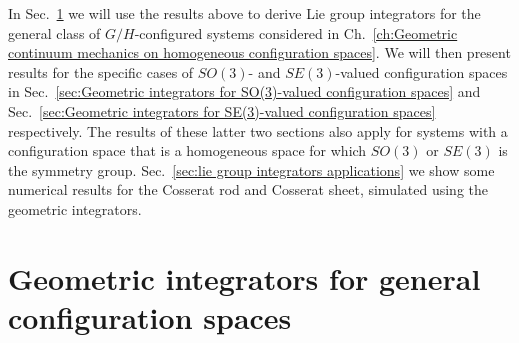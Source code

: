 In Sec.~\ref{sec:Geometric integrators for general configuration spaces} we will use the results above to derive Lie group integrators for the general class of $G/H$-configured systems considered in Ch.~\ref{ch:Geometric continuum mechanics on homogeneous configuration spaces}. We will then present results for the specific cases of $SO(3)$- and $SE(3)$-valued configuration spaces in Sec.~\ref{sec:Geometric integrators for SO(3)-valued configuration spaces} and Sec.~\ref{sec:Geometric integrators for SE(3)-valued configuration spaces} respectively. The results of these latter two sections also apply for systems with a configuration space that is a homogeneous space for which $SO(3)$ or $SE(3)$ is the symmetry group. Sec.~\ref{sec:lie group integrators applications} we show some numerical results for the Cosserat rod and Cosserat sheet, simulated using the geometric integrators.

\section{Geometric integrators for general configuration spaces} \label{sec:Geometric integrators for general configuration spaces}

